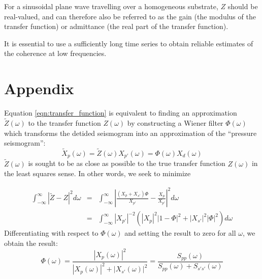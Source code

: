 For a sinusoidal plane wave travelling over a homogeneous substrate, $Z$ should be real-valued, and can therefore also be referred to as the gain (the modulus of the transfer function) or admittance (the real part of the transfer function).










It is essential to use a sufficiently long time series to obtain reliable estimates of the coherence at low frequencies.

\section{Appendix}
Equation \ref{eqn:transfer_function} is equivalent to finding an approximation  $\widetilde{Z} (\omega)$ to the transfer function $Z (\omega)$ by constructing a Wiener filter $\Phi (\omega)$ which transforms the detided seismogram into an approximation of the ``pressure seismogram'':
\begin{equation}
  \widetilde{X}_{p}  (\omega) = \widetilde{Z} (\omega) X_{p'} (\omega) = \Phi (\omega) X_d  (\omega)
\end{equation}
\noindent $\widetilde{Z} (\omega)$ is sought to be as close as possible to the true transfer function $Z (\omega)$ in the least squares sense. In other words, we seek to minimize

\begin{eqnarray}
  \int_{-\infty}^{\infty} \left| \widetilde{Z} - Z \right| ^2 d\omega &=& \int_{-\infty}^{\infty} \left| \frac{ \left(X_{p} + X_{s'}\right) \Phi}{X_{p'}} - \frac{X_{p}}{X_{p'}} \right|^2 d\omega \\
  &=& \int_{-\infty}^{\infty} \left| X_{p'} \right|^{-2} \left( \left| X_{p} \right|^2 \left| 1 - \Phi \right |^2 + \left| X_{s'} \right|^2 \left| \Phi \right|^2 \right) d\omega
\end{eqnarray}
\noindent Differentiating with respect to $\Phi (\omega)$ and setting the result to zero for all $\omega$, we obtain the result:
\begin{equation}
  \Phi (\omega)= \frac{\left| X_p (\omega) \right|^2}{ \left| X_p (\omega) \right|^2 + \left| X_{s'} (\omega) \right|^2 } = \frac{S_{pp} (\omega)}{S_{pp} (\omega) + S_{s's'} (\omega)}
\end{equation}

